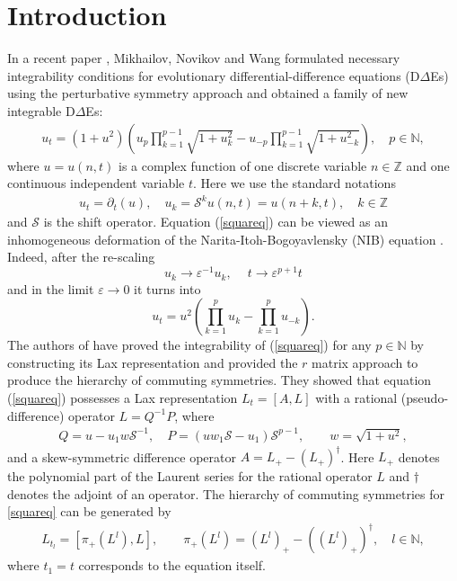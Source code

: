 \documentclass[fleqn,11pt,twoside]{article}
\newcommand\cS{{\mathcal S}}
\newcommand{\field}[1]{\mathbb{#1}}
\newcommand{\Z}{\field{Z}}
\newcommand{\N}{\field{N}}
\theoremstyle{definition}
\begin{document}
\label{firstpage}



\section{Introduction}
In a recent paper \cite{15}, Mikhailov, Novikov and Wang formulated necessary
integrability conditions for evolutionary differential-difference equations (D$\Delta$Es) using the perturbative symmetry approach and
obtained a family of new integrable D$\Delta$Es:
\begin{eqnarray}\label{squareq}
u_t=(1+u^2)(u_p\prod_{k=1}^{p-1}\sqrt{1+u_k^2}-u_{-p}\prod_{k=1}^{p-1}\sqrt{1+u_
{-k}^2}), \quad  p\in \mathbb{N},
\label{initialeq}
\end{eqnarray}
where $u=u(n,t)$ is a complex function of one discrete variable $n\in\Z$ and one
continuous independent variable $t$. Here
we use the standard notations
\begin{eqnarray*}
 u_t=\partial_t(u), \quad u_k=\cS^k u(n,t)=u(n+k,t), \quad k\in \Z
\end{eqnarray*}
and $\cS$ is the shift operator.
Equation (\ref{squareq}) can be viewed as an inhomogeneous deformation of the
Narita-Itoh-Bogoyavlensky (NIB) equation \cite{30}. Indeed, after the re-scaling
\begin{equation}\label{scaling}
u_k\to \varepsilon^{-1} u_k,\quad\ t\to \varepsilon^{p+1}t
\end{equation}
and in the limit $\varepsilon\to
0$ it turns into
\begin{equation}
u_t=u^2(\prod_{k=1}^{p} u_k-\prod_{k=1}^{p} u_{-k})  \label{mNIB}.
\end{equation}
The authors of \cite{15} have proved the integrability of (\ref{squareq}) for any
$p\in \mathbb{N}$ by constructing its Lax representation and provided the $r$
matrix approach to produce the hierarchy of commuting symmetries. They showed
that
equation (\ref{squareq})
possesses a Lax representation  $L_t=[A, L]$ with a rational (pseudo-difference)
operator $L=Q^{-1}P$, where
\begin{eqnarray}\label{lax}
 Q=u - u_1 w \cS^{-1}, \quad P=(u w_1 \cS-u_1) \cS^{p-1},\qquad  w=\sqrt{1+u^2},
\end{eqnarray}
and a skew-symmetric difference operator $A=L_{+}-(L_{+})^{\dagger}$. Here $L_+$
denotes the polynomial part of the Laurent series
for the rational operator $L$ and $\dagger$ denotes the adjoint of an operator. The
hierarchy of commuting symmetries for \eqref{squareq} can be generated by
\begin{eqnarray}\label{symp}
 L_{t_l}=[\pi_{+}(L^l), L], \qquad
\pi_{+}(L^l)=\left(L^l\right)_{+}-\left(\left(L^l\right)_{+}\right)^{\dagger},\quad l\in \N,
\end{eqnarray}
where $t_1=t$ corresponds to the equation itself.
\end{document}
